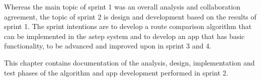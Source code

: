 Whereas the main topic of sprint 1 was an overall analysis and collaboration agreement, the topic of sprint 2 is design and development based on the results of sprint 1. 
The sprint intentions are to develop a route comparison algorithm that can be implemented in the \gls{astep} system and to develop an app that has basic functionality, to be advanced and improved upon in sprint 3 and 4.

This chapter contains documentation of the analysis, design, implementation and test phases of the algorithm and app development performed in sprint 2.